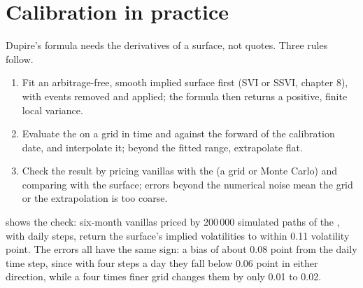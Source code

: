\section{Calibration in practice}

Dupire's formula needs the derivatives of a surface, not quotes. Three rules follow.

\begin{method}\label{met:dv:local-volatility:build}
\begin{enumerate}
\item Fit an arbitrage-free, smooth implied surface first (SVI or SSVI, chapter 8), with events
removed and  applied; the formula then returns a positive, finite local variance.
\item Evaluate the  on a grid in time and  against the forward of the
calibration date, and interpolate it; beyond the fitted range, extrapolate flat.
\item Check the result by pricing vanillas with the  (a grid or Monte Carlo)
and comparing with the surface; errors beyond the numerical noise mean the grid or the extrapolation
is too coarse.
\end{enumerate}
\end{method}

 shows the check: six-month vanillas priced by 200\,000 simulated
paths of the , with daily steps, return the surface's implied volatilities to
within 0.11 volatility point. The errors all have the same sign: a bias of about 0.08 point from the
daily time step, since with four steps a day they fall below 0.06 point in either direction, while a
four times finer grid changes them by only 0.01 to 0.02.


